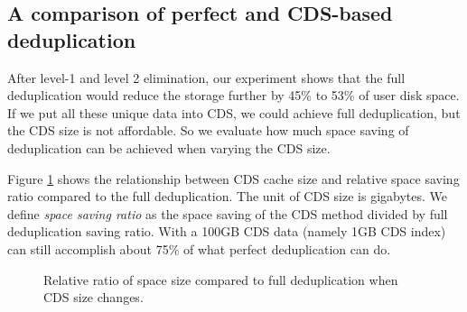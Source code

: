 

\subsection{A comparison of perfect and CDS-based deduplication }
After level-1 and level 2 elimination, our experiment shows that 
the full deduplication would reduce the storage  further   by  45\% to 53\% of user disk space. 
If we put all these unique data into CDS, we could achieve full deduplication,
but the CDS size is not affordable. So we evaluate how much space saving of 
deduplication can be achieved when varying the CDS size.

Figure \ref{fig:datacdssize} shows the relationship between CDS cache size and relative space saving ratio
compared to the full deduplication.  The unit of CDS size is gigabytes.
We define \emph{space saving ratio} as the space saving of the CDS method divided by 
full deduplication saving ratio. 
With a 100GB CDS data (namely 1GB CDS index) can still  accomplish about 75\% 
of what perfect deduplication can do.

\begin{figure}
  \centering
  \caption{Relative ratio of space size compared to full deduplication when CDS size changes.}
  \label{fig:datacdssize}
\end{figure}

